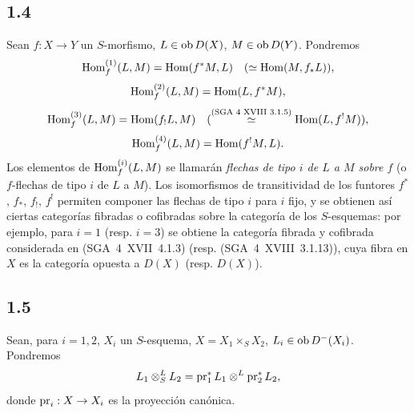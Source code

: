 \subsection*{1.4}
Sean $f:X\to Y$ un $S$-morfismo, $L\in\operatorname{ob} D(X)$, $M\in\operatorname{ob} D(Y)$. Pondremos
\[
\operatorname{Hom}_f^{(1)}(L,M)=\operatorname{Hom}(f^{*}M,L)\quad (\simeq \operatorname{Hom}(M,f_{*}L)),
\]
\[
\operatorname{Hom}_f^{(2)}(L,M)=\operatorname{Hom}(L,f^{*}M),
\]
\[
\operatorname{Hom}_f^{(3)}(L,M)=\operatorname{Hom}(f_{!}L,M)\quad (\overset{\text{(SGA~4~XVIII~3.1.5)}}{\simeq} \operatorname{Hom}(L,f^{!}M)),
\]
\[
\operatorname{Hom}_f^{(4)}(L,M)=\operatorname{Hom}(f^{!}M,L).
\]
Los elementos de $\operatorname{Hom}_f^{(i)}(L,M)$ se llamarán \emph{flechas de tipo $i$ de $L$ a $M$ sobre $f$} (o $f$-flechas de tipo $i$ de $L$ a $M$). Los isomorfismos de transitividad de los funtores $f^{*}$, $f_{*}$, $f_{!}$, $f^{!}$ permiten componer las flechas de tipo $i$ para $i$ fijo, y se obtienen así ciertas categorías fibradas o cofibradas sobre la categoría de los $S$-esquemas: por ejemplo, para $i=1$ (resp. $i=3$) se obtiene la categoría fibrada y cofibrada considerada en (SGA~4~XVII~4.1.3) (resp. (SGA~4~XVIII~3.1.13)), cuya fibra en $X$ es la categoría opuesta a $D(X)$ (resp. $D(X)$).

\subsection*{1.5}
Sean, para $i=1,2$, $X_i$ un $S$-esquema, $X=X_1\times_S X_2$, $L_i\in\operatorname{ob} D^{-}(X_i)$. Pondremos
\[
L_1\otimes^{L}_{S}L_2=\operatorname{pr}_1^{*}L_1\otimes^{L}\operatorname{pr}_2^{*}L_2,
\]
donde $\operatorname{pr}_i:X\to X_i$ es la proyección canónica.


